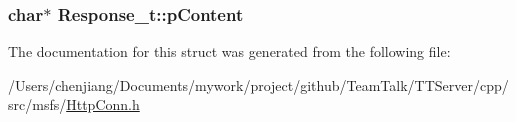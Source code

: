 \subsubsection[{p\+Content}]{\setlength{\rightskip}{0pt plus 5cm}char$\ast$ Response\+\_\+t\+::p\+Content}\label{struct_response__t_add2b628b52fe71a0396dda12f45ac75c}


The documentation for this struct was generated from the following file\+:\begin{DoxyCompactItemize}
\item 
/\+Users/chenjiang/\+Documents/mywork/project/github/\+Team\+Talk/\+T\+T\+Server/cpp/src/msfs/\hyperlink{msfs_2_http_conn_8h}{Http\+Conn.\+h}\end{DoxyCompactItemize}
